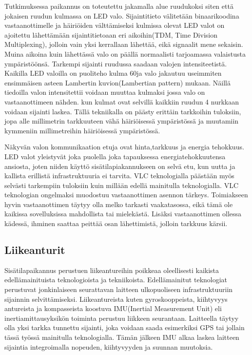Tutkimuksessa\cite{VLCA} paikannus on toteutettu jakamalla alue ruudukoksi siten että jokaisen ruudun kulmassa on LED valo. Sijaintitieto välitetään binaarikoodina vastaanottimelle ja häiriöiden välttämiseksi kulmissa olevat LED valot on ajoitettu lähettämään sijaintitietoaan eri aikoihin(TDM, Time Division Multiplexing), jolloin vain yksi kerrallaan lähettää, eikä signaalit mene sekaisin. Muina aikoina kuin lähettässä valo on päällä normaalisti tarjoamassa valaistusta ympäristöönsä. 
Tarkempi sijainti ruudussa saadaan valojen intensiteetistä. Kaikilla LED valoilla on puoliteho kulma 60\degree ja valo jakautuu useimmiten ensimmäisen asteen Lambertin kuvion(Lambertian pattern) mukaan. Näillä tiedoilla valon intensitettii voidaan muuttaa kulmaksi jossa valo on vastaanottimeen nähden. kun kulmat ovat selvillä kaikkiin ruudun 4 nurkkaan voidaan sijainti laskea.\cite{VLCA}
Tällä tekniikalla on päästy erittäin tarkkoihin tuloksiin, jopa alle millimetrin tarkkuuteen vähä häiriöisessä ympäristössä  ja muutamiin kymmeniin millimetreihin häiriöisessä ympäristössä.

Näkyvän valon kommunikaation etuja ovat hinta,tarkkuus ja energia tehokkuus. LED valot yleistyvät joka puolella joka tapauksessa energiatehokkuutensa ansiosta, joten niiden käyttö sisätilapiakannukseen on selvä etu, kun uutta ja kallista erillistä infrastruktuuria ei tarvita. VLC teknologialla päästään myös selvästi tarkempiin tuloksiin kuin millään edellä mainitulla teknologialla.
VLC teknologian ongelmaksi muodostuu vastaanottimen asennon tärkeys. Toimiakseen hyvin vastaanottimen täytyy olla melko tarkasti vaakatasossa, eikä tämä ole kaikissa sovelluksissa mahdollista tai mielekästä. Lisäksi vastaanottimen ollessa kädessä, ihminen saattaa peittää osan lähettimistä, jolloin tarkkuus kärsii.


\subsection{Liikeanturit}
Sisätilapaikannus perustuen liikeantureihin poikkeaa oleellisesti kaikista edellämainituista teknologioista ja tekniikoista. Edellämainitut teknologiat perustuvat jonkinlaiseen seurattavan laitteen ulkopuoliseen infrastruktuuriin sijainnin selvittämiseksi. Liikeantureista kuten gyroskooppeista, kiihtyvyys antureista ja kompasseista koostuva IMU(Inertial Measurement Unit) eli inertiamittausyksikön toiminta perustuu liikkeen seurantaan. Laitteella täytyy olla yksi tarkka tunnettu sijainti, joka voidaan saada esimerkiksi GPS tai jollain tässä työssä mainitulla teknologialla.\cite{IMU} Tämän jälkeen IMU alkaa laskea laitteen sijaintia integroimalla nopeuden, kiihtyvyyden ja suunnan muutoksia. 


